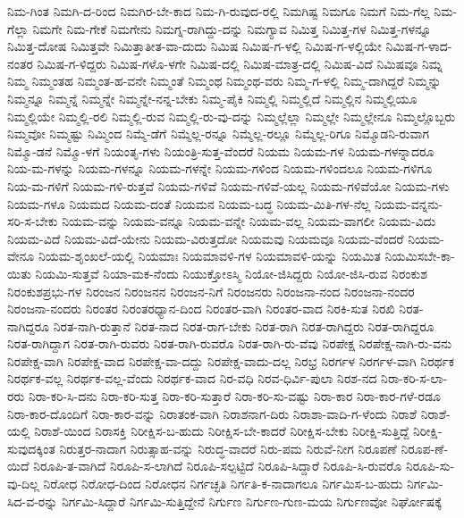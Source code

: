 ನಿಮ-ಗಿಂತ
ನಿಮಗಿ-ದ-ರಿಂದ
ನಿಮಗಿರ-ಬೇ-ಕಾದ
ನಿಮ-ಗಿ-ರುವುದ-ರಲ್ಲಿ
ನಿಮಗಿಷ್ಟ
ನಿಮಗೂ
ನಿಮಗೆ
ನಿಮ-ಗೆಲ್ಲ
ನಿಮ-ಗೆಲ್ಲಾ
ನಿಮಗೇ
ನಿಮ-ಗೇಕೆ
ನಿಮಗೇನು
ನಿಮಗ್ನ-ರಾಗಿದ್ದು-ದನ್ನು
ನಿಮಗ್ಯಾವ
ನಿಮಿತ್ತ
ನಿಮಿತ್ತ-ಗಳ
ನಿಮಿತ್ತ-ಗಳನ್ನೂ
ನಿಮಿತ್ತ-ದೋಷ
ನಿಮಿತ್ತವೇ
ನಿಮಿತ್ತಾತೀತ-ವಾ-ದುದು
ನಿಮಿಷ
ನಿಮಿಷ-ಗ-ಳಲ್ಲಿ
ನಿಮಿಷ-ಗ-ಳಲ್ಲಿಯೇ
ನಿಮಿಷ-ಗ-ಳಾದ-ನಂತರ
ನಿಮಿಷ-ಗ-ಳಿದ್ದರು
ನಿಮಿಷ-ಗಳೊ-ಳಗೇ
ನಿಮಿಷ-ದಲ್ಲಿ
ನಿಮಿಷ-ಮಾತ್ರ-ದಲ್ಲಿ
ನಿಮಿಷ-ವಿದೆ
ನಿಮಿಷವೂ
ನಿಮ್ನ
ನಿಮ್ಮ
ನಿಮ್ಮಂತಹ
ನಿಮ್ಮಂತ-ಹ-ವನೇ
ನಿಮ್ಮಂತೆ
ನಿಮ್ಮಂಥ
ನಿಮ್ಮಂಥ-ವರು
ನಿಮ್ಮ-ಗ-ಳಲ್ಲಿ
ನಿಮ್ಮ-ದಾಗಿದ್ದರೆ
ನಿಮ್ಮನ್ನು
ನಿಮ್ಮನ್ನೂ
ನಿಮ್ಮನ್ನೆ
ನಿಮ್ಮನ್ನೇ
ನಿಮ್ಮನ್ನೇ-ನನ್ನ-ಬೇಕು
ನಿಮ್ಮ-ಪೈಕಿ
ನಿಮ್ಮಲ್ಲಿ
ನಿಮ್ಮಲ್ಲಿದೆ
ನಿಮ್ಮಲ್ಲಿನ
ನಿಮ್ಮಲ್ಲಿಯೂ
ನಿಮ್ಮಲ್ಲಿಯೇ
ನಿಮ್ಮಲ್ಲಿ-ರಲಿ
ನಿಮ್ಮಲ್ಲಿ-ರುವ
ನಿಮ್ಮಲ್ಲಿ-ರು-ವು-ದನ್ನು
ನಿಮ್ಮಲ್ಲೆಲ್ಲಾ
ನಿಮ್ಮಲ್ಲೇ
ನಿಮ್ಮಲ್ಲೇನೂ
ನಿಮ್ಮಲ್ಲೊಬ್ಬರು
ನಿಮ್ಮವೋ
ನಿಮ್ಮಷ್ಟು
ನಿಮ್ಮಿಂದ
ನಿಮ್ಮೆ-ಡೆಗೆ
ನಿಮ್ಮೆಲ್ಲ-ರನ್ನೂ
ನಿಮ್ಮೆಲ್ಲ-ರಲ್ಲೂ
ನಿಮ್ಮೆಲ್ಲ-ರಿಗೂ
ನಿಮ್ಮೊಡನಿ-ರುವಾಗ
ನಿಮ್ಮೊ-ಡನೆ
ನಿಮ್ಮೊ-ಳಗೆ
ನಿಯಂತೃ-ಗಳು
ನಿಯಂತ್ರಿ-ಸುತ್ತ-ವೆಂದರೆ
ನಿಯಮ
ನಿಯಮ-ಗಳ
ನಿಯಮ-ಗಳನ್ನಾದರೂ
ನಿಯ-ಮ-ಗಳನ್ನು
ನಿಯಮ-ಗಳನ್ನೂ
ನಿಯಮ-ಗಳನ್ನೇ
ನಿಯಮ-ಗಳಿಂದ
ನಿಯಮ-ಗಳಿಂದಲೂ
ನಿಯಮ-ಗಳಿಗೂ
ನಿಯ-ಮ-ಗಳಿಗೆ
ನಿಯಮ-ಗಳಿ-ರುತ್ತವೆ
ನಿಯಮ-ಗಳಿವೆ
ನಿಯಮ-ಗಳಿವೆ-ಯಲ್ಲ
ನಿಯಮ-ಗಳಿವೆಯೋ
ನಿಯಮ-ಗಳು
ನಿಯಮ-ಗಳೂ
ನಿಯಮದ
ನಿಯಮ-ದಂತೆ
ನಿಯಮನ
ನಿಯಮ-ಬದ್ಧ
ನಿಯಮ-ಮಿತಿ-ಗಳ-ನೆಲ್ಲ
ನಿಯಮ-ವನ್ನನು-ಸರಿ-ಸ-ಬೇಕು
ನಿಯಮ-ವನ್ನು
ನಿಯಮ-ವನ್ನೂ
ನಿಯಮ-ವನ್ನೇ
ನಿಯಮ-ವಲ್ಲ
ನಿಯಮ-ವಾಗಲೀ
ನಿಯಮ-ವಿದು
ನಿಯಮ-ವಿದೆ
ನಿಯಮ-ವಿದೆ-ಯೇನು
ನಿಯಮ-ವಿರುತ್ತದೋ
ನಿಯಮವು
ನಿಯಮವೂ
ನಿಯಮ-ವೆಂದರೆ
ನಿಯಮ-ವೇನೂ
ನಿಯಮ-ಶೃಂಖಲೆ-ಯಲ್ಲಿ
ನಿಯಮಾಃ
ನಿಯಮಾವಳಿ-ಗಳ
ನಿಯಮಾವಳಿ-ಯನ್ನು
ನಿಯಮಿತ
ನಿಯಮಿಸಬೇ-ಕಾ-ಯಿತು
ನಿಯಮಿ-ಸುತ್ತವೆ
ನಿಯಾ-ಮಕ-ನೆಂದು
ನಿಯುಕ್ತೋಽಸ್ಮಿ
ನಿಯೋ-ಜಿಸಿದ್ದರು
ನಿಯೋ-ಜಿಸಿ-ರುವ
ನಿರಂಕುಶ
ನಿರಂಕುಶಪ್ರಭು-ಗಳ
ನಿರಂಜನ
ನಿರಂಜನನ
ನಿರಂಜನ-ನಿಗೆ
ನಿರಂಜನರು
ನಿರಂಜನಾ-ನಂದ
ನಿರಂಜನಾ-ನಂದರ
ನಿರಂಜನಾ-ನಂದರು
ನಿರಂತರ
ನಿರಂತರಧ್ಯಾನ-ದಿಂದ
ನಿರಂತರ-ವಾಗಿ
ನಿರಂತರ-ವಾದ
ನಿರಕಿ-ಸುತ
ನಿರಖಿ
ನಿರತ-ನಾಗಿದ್ದರೂ
ನಿರತ-ನಾಗಿ-ರುತ್ತಾನೆ
ನಿರತ-ನಾದ
ನಿರತ-ರಾಗ-ಬೇಕು
ನಿರತ-ರಾಗಿ
ನಿರತ-ರಾಗಿದ್ದರು
ನಿರತ-ರಾಗಿದ್ದರೂ
ನಿರತ-ರಾಗಿದ್ದಾಗ
ನಿರತ-ರಾಗಿ-ರುವರು
ನಿರತ-ರಾಗಿ-ರುವರೊ
ನಿರತ-ರಾಗಿ-ರು-ವೆವು
ನಿರಪೇಕ್ಷ
ನಿರಪೇಕ್ಷ-ನಾಗಿ-ರು-ವನು
ನಿರಪೇಕ್ಷ-ವಾಗಿ
ನಿರಪೇಕ್ಷ-ವಾದ
ನಿರಪೇಕ್ಷ-ವಾ-ದದ್ದು
ನಿರಪೇಕ್ಷ-ವಾದು-ದಲ್ಲ
ನಿರಭ್ರ
ನಿರರ್ಗಳ
ನಿರರ್ಗಳ-ವಾಗಿ
ನಿರರ್ಥಕ
ನಿರರ್ಥಕ-ವಲ್ಲ
ನಿರರ್ಥಕ-ವಲ್ಲ-ವೆಂದು
ನಿರರ್ಥಕ-ವಾದ
ನಿರ-ವಧಿ
ನಿರವ-ಧಿರ್ವಿ-ಪುಲಾ
ನಿರಶ-ನದ
ನಿರಾ-ಕರಿ-ಸ-ಲಾ-ರರು
ನಿರಾ-ಕರಿ-ಸಿ-ದನು
ನಿರಾ-ಕರಿ-ಸುತ್ತ
ನಿರಾ-ಕರಿ-ಸುತ್ತಾರೆ
ನಿರಾ-ಕರಿ-ಸು-ವಷ್ಟು
ನಿರಾ-ಕಾರ
ನಿರಾ-ಕಾರ-ಗಳೆ-ರಡೂ
ನಿರಾ-ಕಾರ-ದೊಂದಿಗೆ
ನಿರಾ-ಕಾರ-ವನ್ನು
ನಿರಾತಂಕ-ವಾಗಿ
ನಿರಾಶನಾಗ-ದಿರು
ನಿರಾಶಾ-ವಾದಿ-ಗ-ಳೆಂದು
ನಿರಾಶೆ
ನಿರಾಶೆ-ಯಲ್ಲಿ
ನಿರಾಶೆ-ಯಿಂದ
ನಿರಾಸಕ್ತಿ
ನಿರೀಕ್ಷಿಸ-ಬ-ಹುದು
ನಿರೀಕ್ಷಿಸ-ಬೇ-ಕಾದರೆ
ನಿರೀಕ್ಷಿಸ-ಬೇಕು
ನಿರೀಕ್ಷಿ-ಸುತ್ತಿದ್ದೆ
ನಿರೀಕ್ಷಿ-ಸುವುದಕ್ಕಿಂತ
ನಿರುತ್ತರ-ನಾದಾಗ
ನಿರುತ್ಸಾಹ-ವನ್ನು
ನಿರುದ್ಧ-ವಾದರೆ
ನಿರು-ಪಮ
ನಿರುವೆ-ನೀಗ
ನಿರೂಪಣೆ
ನಿರೂಪ-ಣೆ-ಯಿದೆ
ನಿರೂಪಿ-ತ-ವಾಗಿದೆ
ನಿರೂಪಿ-ಸ-ಲಾಗಿದೆ
ನಿರೂಪಿ-ಸಲ್ಪಟ್ಟಿದೆ
ನಿರೂಪಿ-ಸಿದ್ದಾರೆ
ನಿರೂಪಿ-ಸಿ-ರುವರೊ
ನಿರೂಪಿ-ಸು-ವು-ದಿಲ್ಲ
ನಿರೋಧ
ನಿರೋಧ-ದಿಂದ
ನಿರೋಧನ
ನಿರ್ಗಚ್ಛತಿ
ನಿರ್ಗತಿ-ಕ-ನಾದಾಗಲೂ
ನಿರ್ಗಮಿಸ-ಬ-ಹುದು
ನಿರ್ಗಮಿ-ಸಿದ-ವ-ರನ್ನು
ನಿರ್ಗಮಿ-ಸಿದ್ದಾರೆ
ನಿರ್ಗಮಿ-ಸುತ್ತಿದ್ದೇನೆ
ನಿರ್ಗುಣ
ನಿರ್ಗುಣ-ಗುಣ-ಮಯ
ನಿರ್ಗುಣವೋ
ನಿರ್ಘೋಷಕ್ಕೆ
